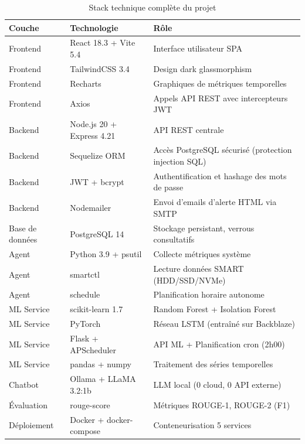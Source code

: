 \begin{table}[H]
\centering
\caption{Stack technique complète du projet}
\begin{tabularx}{\textwidth}{|l|l|X|}
\hline
\rowcolor{lightblue}
\textbf{Couche} & \textbf{Technologie} & \textbf{Rôle} \\
\hline
Frontend & React 18.3 + Vite 5.4 & Interface utilisateur SPA \\
\hline
Frontend & TailwindCSS 3.4 & Design dark glassmorphism \\
\hline
Frontend & Recharts & Graphiques de métriques temporelles \\
\hline
Frontend & Axios & Appels API REST avec intercepteurs JWT \\
\hline
Backend & Node.js 20 + Express 4.21 & API REST centrale \\
\hline
Backend & Sequelize ORM & Accès PostgreSQL sécurisé (protection injection SQL) \\
\hline
Backend & JWT + bcrypt & Authentification et hashage des mots de passe \\
\hline
Backend & Nodemailer & Envoi d'emails d'alerte HTML via SMTP \\
\hline
Base de données & PostgreSQL 14 & Stockage persistant, verrous consultatifs \\
\hline
Agent & Python 3.9 + psutil & Collecte métriques système \\
\hline
Agent & smartctl & Lecture données SMART (HDD/SSD/NVMe) \\
\hline
Agent & schedule & Planification horaire autonome \\
\hline
ML Service & scikit-learn 1.7 & Random Forest + Isolation Forest \\
\hline
ML Service & PyTorch & Réseau LSTM (entraîné sur Backblaze) \\
\hline
ML Service & Flask + APScheduler & API ML + Planification cron (2h00) \\
\hline
ML Service & pandas + numpy & Traitement des séries temporelles \\
\hline
Chatbot & Ollama + LLaMA 3.2:1b & LLM local (0 cloud, 0 API externe) \\
\hline
Évaluation & rouge-score & Métriques ROUGE-1, ROUGE-2 (F1) \\
\hline
Déploiement & Docker + docker-compose & Conteneurisation 5 services \\
\hline
\end{tabularx}
\end{table}

